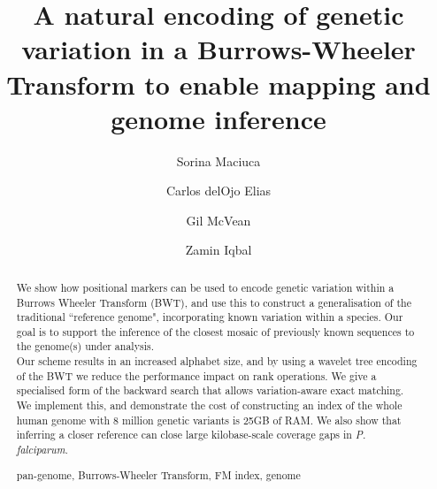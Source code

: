 \documentclass[runningheads,a4paper]{llncs}
\newcommand{\keywords}[1]{\par\addvspace\baselineskip
\noindent\keywordname\enspace\ignorespaces#1}
\begin{document}
\mainmatter  %

\title{A natural encoding of genetic variation in a Burrows-Wheeler Transform  to enable mapping and genome inference}


%
%
\author{Sorina Maciuca%
\and Carlos delOjo Elias\and Gil McVean \and Zamin Iqbal}
%



\maketitle


\begin{abstract}
We show how positional markers can be used to encode genetic variation within a Burrows Wheeler Transform (BWT), and use this to construct a generalisation of the traditional ``reference genome", incorporating known variation within a species. Our goal is to support the inference of the closest mosaic of previously known sequences to the genome(s) under analysis.\\ Our scheme results in an increased alphabet size, and by using a wavelet tree encoding of the BWT we reduce the performance impact on rank operations. We give a specialised form of the backward search that allows variation-aware exact matching. We implement this, and demonstrate the cost of constructing an index of the whole human genome with 8 million genetic variants is 25GB of RAM. We also show that inferring a closer reference can close large kilobase-scale coverage gaps in \textit{P. falciparum}.
\keywords{pan-genome, Burrows-Wheeler Transform, FM index, genome}
\end{abstract}
\end{document}
